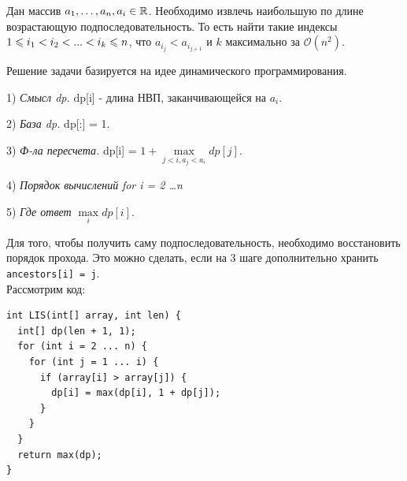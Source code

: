 \Task Дан массив $a_{1}, \dots , a_{n}, a_{i} \in \mathbb{R}$. Необходимо извлечь наибольшую по
длине возрастающую подпоследовательность. То есть найти такие
индексы $1 \leqslant i_{1} < i_{2} < . . . < i_{k} \leqslant n$, что $a_{i_{j}} < a_{i_{j+1}}$ и $k$ максимально за $\mathcal{O}(n^2)$.

\Solution Решение задачи базируется на идее динамического программирования.

1) \textit{Смысл dp.} dp[i] - длина НВП, заканчивающейся на $a_{i}$.

2) \textit{База dp.} dp[:] = 1.

3) \textit{Ф-ла пересчета.} dp[i] = $1 + \max \limits_{j<i,a_j<a_i} dp[j]$.

4) \textit{Порядок вычислений} \textit{for i = 2 \dots n}

5) \textit{Где ответ}  $\max \limits_{i} dp[i]$.

\Note Для того, чтобы получить саму подпоследовательность, необходимо восстановить порядок прохода. Это можно сделать, если на 3 шаге дополнительно хранить \texttt{ancestors[i] = j}.\\

Рассмотрим код:

\begin{lstlisting}
int LIS(int[] array, int len) {
  int[] dp(len + 1, 1);
  for (int i = 2 ... n) {
    for (int j = 1 ... i) {
      if (array[i] > array[j]) {
        dp[i] = max(dp[i], 1 + dp[j]);
      }
    }
  }
  return max(dp);
}
\end{lstlisting}
\pagebreak
